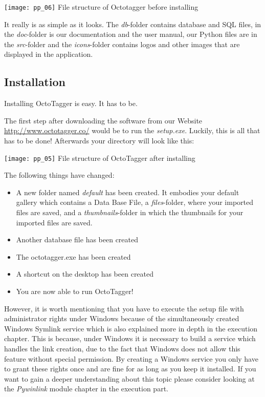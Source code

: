 \begin{center}
\texttt{[image: pp\_06]}
\small{File structure of Octotagger before installing}
\end{center}

It really is as simple as it looks. The \textit{db}-folder contains database and SQL files, in the \textit{doc}-folder is our documentation and the user manual, our Python files are in the \textit{src}-folder and the \textit{icons}-folder contains logos and other images that are displayed in the application.

\subsection{Installation}
Installing OctoTagger is easy. It has to be. 

The first step after downloading the software from our Website \url{http://www.octotagger.co/} would be to run the \textit{setup.exe}. Luckily, this is all that has to be done! Afterwards your directory will look like this:

\begin{center}
\texttt{[image: pp\_05]}
\small{File structure of OctoTagger after installing}
\end{center}


The following things have changed:
\begin{itemize}
	\item A new folder named \textit{default} has been created. It embodies your default gallery which contains a Data Base File, a \textit{files}-folder, where your imported files are saved, and a \textit{thumbnails}-folder in which the thumbnails for your imported files are saved.
	\item Another database file has been created
	\item The octotagger.exe has been created
	\item A shortcut on the desktop has been created
	\item You are now able to run OctoTagger!
\end{itemize}

However, it is worth mentioning that you have to execute the setup file with administrator rights under Windows because of the simultaneously created Windows Symlink service which is also explained more in depth in the execution chapter. This is because, under Windows it is necessary to build a service which handles the link creation, due to the fact that Windows does not allow this feature without special permission. By creating a Windows service you only have to grant these rights once and are fine for as long as you keep it installed. If you want to gain a deeper understanding about this topic please consider looking at the \textit{Pywinlink} module chapter in the execution part.

